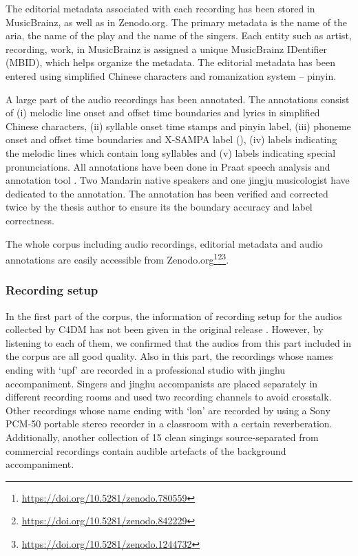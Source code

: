 The editorial metadata associated with each recording has been stored in MusicBrainz, as well as in Zenodo.org. The primary metadata is the name of the aria, the name of the play and the name of the singers. Each entity such as artist, recording, work, in MusicBrainz is assigned a unique MusicBrainz IDentifier (MBID), which helps organize the metadata. The editorial metadata has been entered using simplified Chinese characters and romanization system -- pinyin. 

A large part of the audio recordings has been annotated. The annotations consist of (i) melodic line onset and offset time boundaries and lyrics in simplified Chinese characters, (ii) syllable onset time stamps and pinyin label, (iii) phoneme onset and offset time boundaries and X-SAMPA label (), (iv) labels indicating the melodic lines which contain long syllables and (v) labels indicating special pronunciations. All annotations have been done in Praat speech analysis and annotation tool \cite{boersma_praat_2001}. Two Mandarin native speakers and one jingju musicologist have dedicated to the annotation. The annotation has been verified and corrected twice by the thesis author to ensure its the boundary accuracy and label correctness.

The whole corpus including audio recordings, editorial metadata and audio annotations are easily accessible from Zenodo.org\footnote{\url{https://doi.org/10.5281/zenodo.780559}}\footnote{\url{https://doi.org/10.5281/zenodo.842229}}\footnote{\url{https://doi.org/10.5281/zenodo.1244732}}.

\subsubsection{Recording setup}\label{sec:ch4:recording_setup}

In the first part of the corpus, the information of recording setup for the audios collected by C4DM has not been given in the original release \cite{Black2014}. However, by listening to each of them, we confirmed that the audios from this part included in the corpus are all good quality. Also in this part, the recordings whose names ending with `upf' are recorded in a professional studio with jinghu accompaniment. Singers and jinghu accompanists are placed separately in different recording rooms and used two recording channels to avoid crosstalk. Other recordings whose name ending with `lon' are recorded by using a Sony PCM-50 portable stereo recorder in a classroom with a certain reverberation. Additionally, another collection of 15 clean singings source-separated from commercial recordings contain audible artefacts of the background accompaniment.

